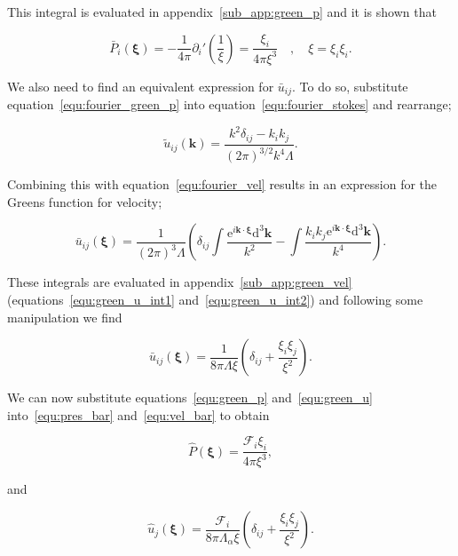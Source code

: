 \documentclass[12pt]{article}
\begin{document}
This integral is evaluated in appendix~\ref{sub_app:green_p} and it is shown that

\begin{equation}
\label{equ:green_p}
\bar{P}_{i} (\boldsymbol\xi) = -\frac{1}{4 \pi} \partial_{i}' \left(\frac{1}{\xi}\right) = \frac{\xi_{i}}{4 \pi \xi^{3}} \quad , \quad \xi = \xi_{i} \xi_{i} .
\end{equation}

We also need to find an equivalent expression for $\bar{u}_{ij}$. To do so, substitute equation~\ref{equ:fourier_green_p} into equation~\ref{equ:fourier_stokes} and rearrange;

\begin{equation}
\label{equ:fourier_green_u}
\tilde{u}_{ij} (\boldsymbol{k}) = \frac{k^{2} \delta_{ij} - k_{i} k_{j}}{(2 \pi)^{3/2} k^{4} \Lambda} .
\end{equation}

Combining this with equation~\ref{equ:fourier_vel} results in an expression for the Greens function for velocity;

\begin{equation}
\label{equ:green_u_int}
\bar{u}_{ij} (\boldsymbol\xi) = \frac{1}{(2 \pi)^{3} \Lambda} \left(\delta_{ij} \int \frac{\mathrm{e}^{i \boldsymbol{k} \cdot \boldsymbol\xi} \mathrm{d}^{3} \boldsymbol{k}}{k^{2}} - \int \frac{k_{i} k_{j} \mathrm{e}^{i \boldsymbol{k} \cdot \boldsymbol\xi} \mathrm{d}^{3} \boldsymbol{k}}{k^{4}} \right).
\end{equation}

These integrals are evaluated in appendix~\ref{sub_app:green_vel} (equations~\ref{equ:green_u_int1} and~\ref{equ:green_u_int2}) and following some manipulation we find

\begin{equation}
\label{equ:green_u}
\bar{u}_{ij} (\boldsymbol\xi) = \frac{1}{8 \pi \Lambda \xi} \left(\delta_{ij} + \frac{\xi_{i} \xi_{j}}{\xi^{2}} \right).
\end{equation}

We can now substitute equations~\ref{equ:green_p} and~\ref{equ:green_u} into~\ref{equ:pres_bar} and~\ref{equ:vel_bar} to obtain

\begin{equation}
\label{equ:p_hat_eval}
\hat{P} (\boldsymbol\xi) = \frac{\mathcal{F}_{i} \xi_{i}}{4 \pi \xi^{3}},
\end{equation}

and 

\begin{equation}
\label{equ:u_hat_eval}
\hat{u}_{j}(\boldsymbol\xi) = \frac{\mathcal{F}_{i}}{8 \pi \Lambda_{\alpha} \xi} \left(\delta_{ij} + \frac{\xi_{i} \xi_{j}}{\xi^{2}} \right).
\end{equation}
\end{document}
